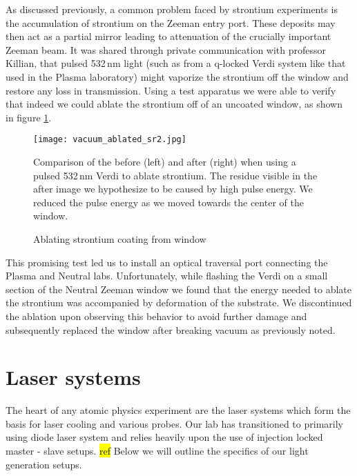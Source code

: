 As discussed previously, a common problem faced by strontium experiments is the accumulation of strontium on the Zeeman entry port. 
These deposits may then act as a partial mirror leading to attenuation of the crucially important Zeeman beam. 
It was shared through private communication with professor Killian, that pulsed 532\,nm light (such as from a q-locked Verdi system like that used in the Plasma laboratory) might vaporize the strontium off the window and restore any loss in transmission. 
Using a test apparatus we were able to verify that indeed we could ablate the strontium off of an uncoated window, as shown in figure \ref{fig:ablating_strontium}.
	\begin{figure}
		\centerline{
		\texttt{[image: vacuum\_ablated\_sr2.jpg]}}
		\caption{Ablating strontium coating from window}{Comparison of the before (left) and after (right) when using a pulsed 532\,nm Verdi to ablate strontium. The residue visible in the after image we hypothesize to be caused by high pulse energy. We reduced the pulse energy as we moved towards the center of the window.}
		\label{fig:ablating_strontium}
	\end{figure}
This promising test led us to install an optical traversal port connecting the Plasma and Neutral labs. 
Unfortunately, while flashing the Verdi on a small section of the Neutral Zeeman window we found that the energy needed to ablate the strontium was accompanied by deformation of the substrate.
We discontinued the ablation upon observing this behavior to avoid further damage and subsequently replaced the window after breaking vacuum as previously noted.


\pagebreak
\section{Laser systems}\label{sec:laser_systems}
\setcounter{footnote}{0}
The heart of any atomic physics experiment are the laser systems which form the basis for laser cooling and various probes.
Our lab has transitioned to primarily using diode laser system and relies heavily upon the use of injection locked master - slave setups. \hl{ref}
Below we will outline the specifics of our light generation setups.

